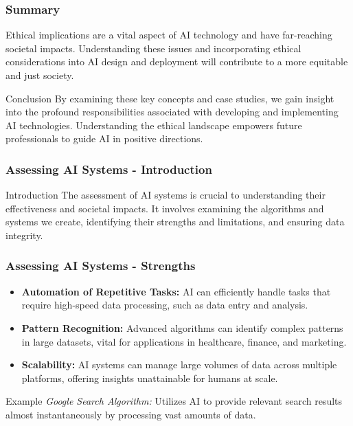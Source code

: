 \documentclass{beamer}
\begin{document}
\begin{frame}[fragile]
    \frametitle{Summary}
    Ethical implications are a vital aspect of AI technology and have far-reaching societal impacts. Understanding these issues and incorporating ethical considerations into AI design and deployment will contribute to a more equitable and just society.
    
    \begin{block}{Conclusion}
        By examining these key concepts and case studies, we gain insight into the profound responsibilities associated with developing and implementing AI technologies. Understanding the ethical landscape empowers future professionals to guide AI in positive directions.
    \end{block}
\end{frame}

\begin{frame}[fragile]
    \frametitle{Assessing AI Systems - Introduction}
    \begin{block}{Introduction}
        The assessment of AI systems is crucial to understanding their effectiveness and societal impacts. 
        It involves examining the algorithms and systems we create, identifying their strengths and limitations, and ensuring data integrity.
    \end{block}
\end{frame}

\begin{frame}[fragile]
    \frametitle{Assessing AI Systems - Strengths}
    \begin{itemize}
        \item \textbf{Automation of Repetitive Tasks:} AI can efficiently handle tasks that require high-speed data processing, such as data entry and analysis.
        \item \textbf{Pattern Recognition:} Advanced algorithms can identify complex patterns in large datasets, vital for applications in healthcare, finance, and marketing.
        \item \textbf{Scalability:} AI systems can manage large volumes of data across multiple platforms, offering insights unattainable for humans at scale.
    \end{itemize}
    
    \begin{block}{Example}
        \textit{Google Search Algorithm:} Utilizes AI to provide relevant search results almost instantaneously by processing vast amounts of data.
    \end{block}
\end{frame}
\end{document}
